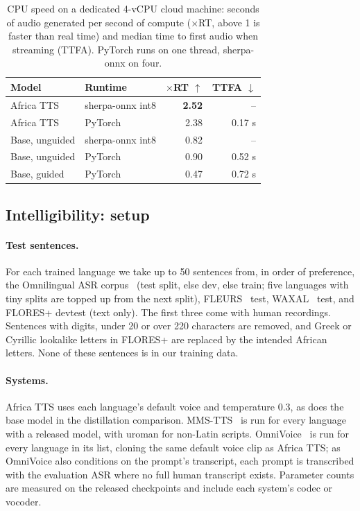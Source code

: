 \documentclass[10pt,twocolumn]{article}
\newcommand{\att}{Africa TTS}
\begin{document}
\begin{table}[t]
\centering
\small
\begin{tabular}{llrr}
\toprule
\textbf{Model} & \textbf{Runtime} & \textbf{$\times$RT} $\uparrow$ & \textbf{TTFA} $\downarrow$ \\
\midrule
Africa TTS & sherpa-onnx int8 & \textbf{2.52} & -- \\
Africa TTS & PyTorch & 2.38 & 0.17 s \\
Base, unguided & sherpa-onnx int8 & 0.82 & -- \\
Base, unguided & PyTorch & 0.90 & 0.52 s \\
Base, guided & PyTorch & 0.47 & 0.72 s \\
\bottomrule
\end{tabular}
\caption{CPU speed on a dedicated 4-vCPU cloud machine: seconds of audio generated per second of compute ($\times$RT, above 1 is faster than real time) and median time to first audio when streaming (TTFA). PyTorch runs on one thread, sherpa-onnx on four.}
\label{tab:speed}
\end{table}

\subsection{Intelligibility: setup}
\paragraph{Test sentences.} For each trained language we take up to 50 sentences from, in order
of preference, the Omnilingual ASR corpus~\cite{omniasr2025} (test split, else dev, else
train; five languages with tiny splits are topped up from the next split), FLEURS~\cite{conneau2023fleurs} test, WAXAL~\cite{diack2026waxal} test, and FLORES+
\cite{floresplus,nllb2022} devtest (text only). The first three come with human recordings.
Sentences with digits, under 20 or over 220 characters are removed, and Greek or Cyrillic
lookalike letters in FLORES+ are replaced by the intended African letters. None of these
sentences is in our training data.

\paragraph{Systems.} \att{} uses each language's default voice and temperature 0.3, as does
the base model in the distillation comparison. MMS-TTS~\cite{pratap2023mms} is run for every language
with a released model, with uroman for non-Latin scripts. OmniVoice~\cite{zhu2026omnivoice}
is run for every language in its list, cloning the same default voice clip as \att{}; as
OmniVoice also conditions on the prompt's transcript, each prompt is transcribed with the
evaluation ASR where no full human transcript exists. Parameter counts are measured on the
released checkpoints and include each system's codec or vocoder.
\end{document}
